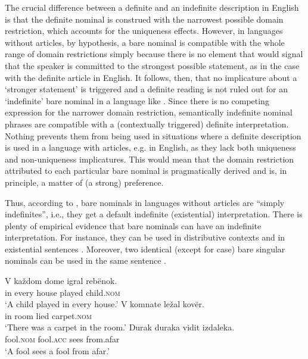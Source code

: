 \documentclass[output=paper,
colorlinks,
citecolor=brown,
newtxmath
]{langscibook}
\begin{document}
The crucial difference between a definite and an indefinite description in English is that the definite nominal is construed with the narrowest possible domain restriction, which accounts for the uniqueness effects. However, in languages without articles, by hypothesis, a bare nominal is compatible with the whole range of domain restrictions simply because there is no element that would signal that the speaker is committed to the strongest possible statement, as in the case with the definite article in English. It follows, then, that no implicature about a `stronger statement' is triggered and a definite reading is not ruled out for an `indefinite' bare nominal in a language like . Since there is no competing expression for the narrower domain restriction, semantically indefinite nominal phrases are compatible with a (contextually triggered) definite interpretation. Nothing prevents them from being used in situations where a definite description is used in a language with articles, e.g. in English, as they lack both uniqueness and non-uniqueness implicatures. This would mean that the domain restriction attributed to each particular bare nominal is pragmatically derived and is, in principle, a matter of (a strong) preference.

Thus, according to \citet[1006]{Heim2011}, bare nominals in languages without articles are ``simply indefinites'', i.e., they get a default indefinite (existential) interpretation. There is plenty of empirical evidence that
 bare nominals can have an indefinite interpretation. For instance, they can be used in distributive contexts  and in existential sentences . Moreover, two identical (except for case) bare singular nominals can be used in the same sentence .

\ea \label{ex:seres:28}
\gll	V	každom	dome		igral		rebënok. \\
	   	in	every		house	played	child.\textsc{nom}\\
	\glt `A child played in every house.'
\z
\ea \label{ex:seres:29}
\gll	V	komnate	ležal	kovër. \\
in 	room 		lied 	carpet.\textsc{nom}\\
\glt`There was a carpet in the room.'
\z
\ea \label{ex:seres:30}
\gll	Durak		duraka	vidit	izdaleka. \\
fool.\textsc{nom} 	fool.\textsc{acc} 	sees 	from.afar\\
\glt `A fool sees a fool from afar.'
\z
\end{document}
